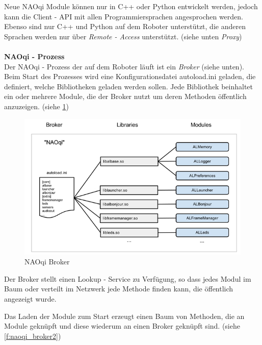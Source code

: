 Neue NAOqi Module können nur in C++ oder Python entwickelt werden, jedoch kann die Client - API mit allen Programmiersprachen angesprochen werden. Ebenso sind nur C++ und Python auf dem Roboter unterstützt, die anderen Sprachen werden nur über \textit{Remote - Access} unterstützt. (siehe unten \textit{Proxy})
\\
\\
\textbf{NAOqi - Prozess}
\\
Der NAOqi - Prozess der auf dem Roboter läuft ist ein \textit{Broker} (siehe unten). Beim Start des Prozesses wird eine Konfigurationsdatei \textsf{autoload.ini} geladen, die definiert, welche Bibliotheken geladen werden sollen. Jede Bibliothek beinhaltet ein oder mehrere Module, die der Broker nutzt um deren Methoden öffentlich anzuzeigen. (siehe \ref{f:naoqi_broker1})

\begin{figure}[H]						
	\centering							
	\includegraphics[scale=0.8]{Bilder/naoqi_process1.PNG}
	\caption{NAOqi Broker}						
	\label{f:naoqi_broker1}						
\end{figure}

Der Broker 	stellt einen Lookup - Service zu Verfügung, so dass jedes Modul im Baum oder verteilt im Netzwerk jede Methode finden kann, die öffentlich angezeigt wurde.

Das Laden der Module zum Start erzeugt einen Baum von Methoden, die an Module geknüpft und diese wiederum an einen Broker geknüpft sind. (siehe \ref{f:naoqi_broker2})

